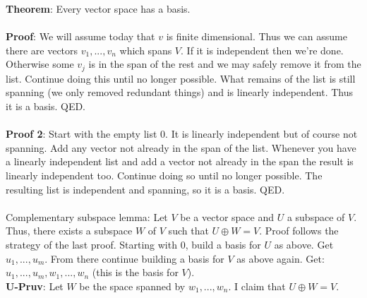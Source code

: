 \documentclass{article}
\begin{document}
\textbf{Theorem}: Every vector space has a basis. \\ \\ 
\textbf{Proof}: We will assume today that $v$ is finite dimensional. Thus we can assume there are vectors $v_1, ..., v_n$ which spans $V$. If it is independent then we're done. Otherwise some $v_j$ is in the span of the rest and we may safely remove it from the list. Continue doing this until no longer possible. What remains of the list is still spanning (we only removed redundant things) and is linearly independent. Thus it is a basis. QED. \\ \\
\textbf{Proof 2}: Start with the empty list $0$. It is linearly independent but of course not spanning. Add any vector not already in the span of the list. Whenever you have a linearly independent list and add a vector not already in the span the result is linearly independent too. Continue doing so until no longer possible. The resulting list is independent and spanning, so it is a basis. QED.  \\ \\
Complementary subspace lemma: Let $V$ be a vector space and $U$ a subspace of $V$. Thus, there exists a subspace $W$ of $V$ such that $U \oplus W = V$. Proof follows the strategy of the last proof. Starting with $0$, build a basis for $U$ as above. Get $u_1, ..., u_m$. From there continue building a basis for $V$ as above again. Get: $u_1, ..., u_m, w_1, ..., w_n$ (this is the basis for $V$). \\

\textbf{U-Pruv}: Let $W$ be the space spanned by $w_1, ..., w_n$. I claim that $U \oplus W = V$. 
\end{document}
